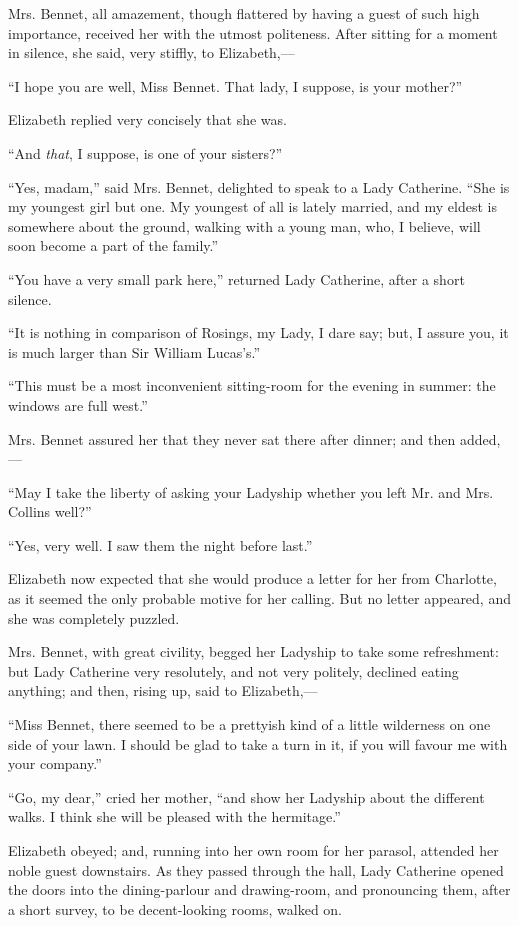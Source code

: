 \documentclass[12pt,openright]{book}
\begin{document}
Mrs. Bennet, all amazement, though flattered by having a guest of such high importance, received her with the utmost politeness. After sitting for a moment in silence, she said, very stiffly, to Elizabeth,—

“I hope you are well, Miss Bennet. That lady, I suppose, is your mother?”

Elizabeth replied very concisely that she was.

“And \textit{that}, I suppose, is one of your sisters?”

“Yes, madam,” said Mrs. Bennet, delighted to speak to a Lady Catherine. “She is my youngest girl but one. My youngest of all is lately married, and my eldest is somewhere about the ground, walking with a young man, who, I believe, will soon become a part of the family.”

“You have a very small park here,” returned Lady Catherine, after a short silence.

“It is nothing in comparison of Rosings, my Lady, I dare say; but, I assure you, it is much larger than Sir William Lucas’s.”

“This must be a most inconvenient sitting-room for the evening in summer: the windows are full west.”

Mrs. Bennet assured her that they never sat there after dinner; and then added,—

“May I take the liberty of asking your Ladyship whether you left Mr. and Mrs. Collins well?”

“Yes, very well. I saw them the night before last.”

Elizabeth now expected that she would produce a letter for her from Charlotte, as it seemed the only probable motive for her calling. But no letter appeared, and she was completely puzzled.

Mrs. Bennet, with great civility, begged her Ladyship to take some refreshment: but Lady Catherine very resolutely, and not very politely, declined eating anything; and then, rising up, said to Elizabeth,—

“Miss Bennet, there seemed to be a prettyish kind of a little wilderness on one side of your lawn. I should be glad to take a turn in it, if you will favour me with your company.”

“Go, my dear,” cried her mother, “and show her Ladyship about the different walks. I think she will be pleased with the hermitage.”

Elizabeth obeyed; and, running into her own room for her parasol, attended her noble guest downstairs. As they passed through the hall, Lady Catherine opened the doors into the dining-parlour and drawing-room, and pronouncing them, after a short survey, to be decent-looking rooms, walked on.
\end{document}
